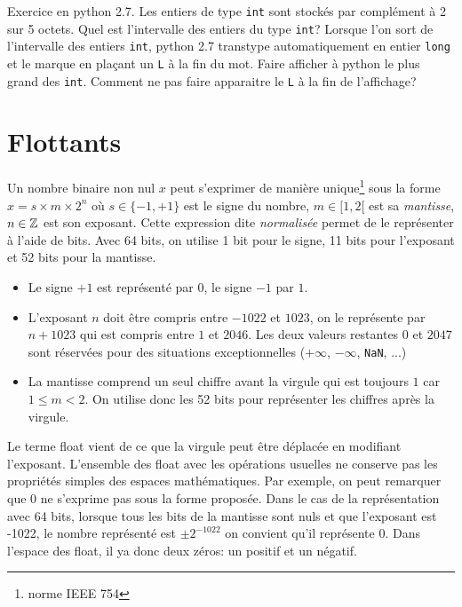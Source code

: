 Exercice en python 2.7.\newline
Les entiers de type \texttt{int} sont stockés par complément à 2 sur 5 octets. Quel est l'intervalle des entiers du type \texttt{int}?\newline
Lorsque l'on sort de l'intervalle des entiers \texttt{int}, python 2.7 transtype automatiquement en entier \texttt{long} et le marque en plaçant un \texttt{L} à la fin du mot. Faire afficher à python le plus grand des \texttt{int}. Comment ne pas faire apparaitre le \texttt{L} à la fin de l'affichage?   

\section{Flottants}
Un nombre binaire non nul $x$ peut s'exprimer de manière unique\footnote{norme IEEE 754} sous la forme $x = s\times m\times 2^n$ où $s\in\{-1,+1\}$ est le signe du nombre, $m\in [1,2[$ est sa \emph{mantisse}, $n\in \mathbb{Z}$ est son exposant.\newline
Cette expression dite \emph{normalisée} permet de le représenter à l'aide de bits.\newline
Avec 64 bits, on utilise 1 bit pour le signe, 11 bits pour l'exposant et 52 bits pour la mantisse.
\begin{itemize}
 \item Le signe $+1$ est représenté par $0$, le signe $-1$ par $1$.
 \item L'exposant $n$ doit être compris entre $-1022$ et $1023$, on le représente par $n + 1023$ qui est compris entre $1$ et $2046$. Les deux valeurs restantes $0$ et $2047$ sont réservées pour des situations exceptionnelles ($+\infty$, $-\infty$, \verb|NaN|, ...)
 \item La mantisse comprend un seul chiffre avant la virgule qui est toujours $1$ car $1\leq m <2$. On utilise donc les 52 bits pour représenter les chiffres après la virgule. 
\end{itemize}
Le terme float vient de ce que la virgule peut être déplacée en modifiant l'exposant.\newline
L'ensemble des float avec les opérations usuelles ne conserve pas les propriétés simples des espaces mathématiques.\newline
Par exemple, on peut remarquer que $0$ ne s'exprime pas sous la forme proposée. Dans le cas de la représentation avec 64 bits, lorsque tous les bits de la mantisse sont nuls et que l'exposant est -1022, le nombre représenté est $\pm 2^{-1022}$ on convient qu'il représente $0$. Dans l'espace des float, il ya donc deux zéros: un positif et un négatif.\newline
